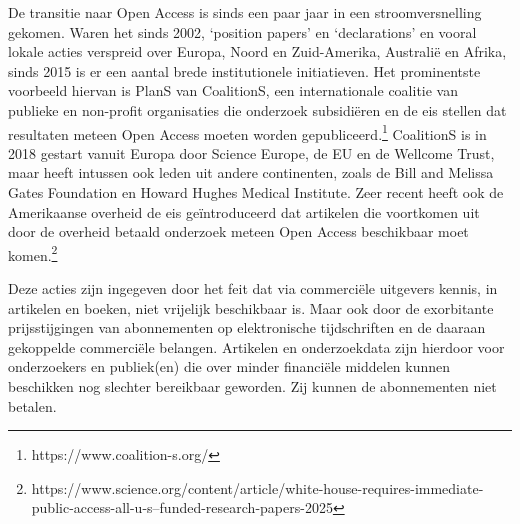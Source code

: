 \documentclass{jote-book}
\begin{document}
	De transitie naar Open Access is sinds een paar jaar in een stroomversnelling gekomen. Waren het sinds 2002, ‘position papers' en ‘declarations' en vooral lokale acties verspreid over Europa, Noord en Zuid-Amerika, Australië en Afrika, sinds 2015 is er een aantal brede institutionele initiatieven. Het prominentste voorbeeld hiervan is PlanS van CoalitionS, een internationale coalitie van publieke en non-profit organisaties die onderzoek subsidiëren en de eis stellen dat resultaten meteen Open Access moeten worden gepubliceerd.\footnote{https://www.coalition-s.org/} CoalitionS is in 2018 gestart vanuit Europa door Science Europe, de EU en de Wellcome Trust, maar heeft intussen ook leden uit andere continenten, zoals de Bill and Melissa Gates Foundation en Howard Hughes Medical Institute. Zeer recent heeft ook de Amerikaanse overheid de eis geïntroduceerd dat artikelen die voortkomen uit door de overheid betaald onderzoek meteen Open Access beschikbaar moet komen.\footnote{https://www.science.org/content/article/white-house-requires-immediate-public-access-all-u-s--funded-research-papers-2025}



	Deze acties zijn ingegeven door het feit dat via commerciële uitgevers kennis, in artikelen en boeken, niet vrijelijk beschikbaar is. Maar ook door de exorbitante prijsstijgingen van abonnementen op elektronische tijdschriften en de daaraan gekoppelde commerciële belangen. Artikelen en onderzoekdata zijn hierdoor voor onderzoekers en publiek(en) die over minder financiële middelen kunnen beschikken nog slechter bereikbaar geworden. Zij kunnen de abonnementen niet betalen.
\end{document}
